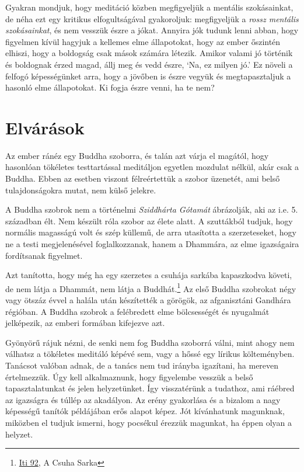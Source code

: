 Gyakran mondjuk, hogy meditáció közben megfigyeljük a mentális
szokásainkat, de néha ezt egy kritikus elfogultságával gyakoroljuk:
megfigyeljük a \emph{rossz mentális szokásainkat}, és nem vesszük észre
a jókat. Annyira jók tudunk lenni abban, hogy figyelmen kívül hagyjuk a
kellemes elme állapotokat, hogy az ember őszintén elhiszi, hogy a
boldogság csak mások számára létezik. Amikor valami jó történik és
boldognak érzed magad, állj meg és vedd észre, `Na, ez milyen jó.' Ez
növeli a felfogó képességünket arra, hogy a jövőben is észre vegyük és
megtapasztaljuk a hasonló elme állapotokat. Ki fogja észre venni, ha te
nem?

\clearpage

\section{Elvárások}


\noindent Az ember ránéz egy Buddha szoborra, és talán azt várja el
magától, hogy hasonlóan tökéletes testtartással meditáljon egyetlen
mozdulat nélkül, akár csak a Buddha. Ebben az esetben viszont
félreértettük a szobor üzenetét, ami belső tulajdonságokra mutat, nem
külső jelekre.

A Buddha szobrok nem a történelmi \emph{Sziddhárta Gótamát} ábrázolják,
aki az i.e. 5. században élt. Nem készült róla szobor az élete alatt. A
szuttákból tudjuk, hogy normális magasságú volt és szép küllemű, de arra
utasította a szerzeteseket, hogy ne a testi megjelenésével
foglalkozzanak, hanem a Dhammára, az elme igazságaira fordítsanak
figyelmet.

Azt tanította, hogy még ha egy szerzetes a csuhája sarkába kapaszkodva
követi, de nem látja a Dhammát, nem látja a Buddhát.\footnote{\href{https://suttacentral.net/iti92}{Iti
  92}, A Csuha Sarka} Az első Buddha szobrokat négy vagy ötszáz évvel a
halála után készítették a görögök, az afganisztáni Gandhára régióban. A
Buddha szobrok a felébredett elme bölcsességét és nyugalmát jelképezik,
az emberi formában kifejezve azt.

Gyönyörű rájuk nézni, de senki nem fog Buddha szoborrá válni, mint ahogy
nem válhatsz a tökéletes meditáló képévé sem, vagy a hőssé egy lírikus
költeményben. Tanácsot valóban adnak, de a tanács nem tud irányba
igazítani, ha mereven értelmezzük. Úgy kell alkalmaznunk, hogy
figyelembe vesszük a belső tapasztalatunkat és jelen helyzetünket. Így
visszatérünk a tudathoz, ami ráébred az igazságra és túllép az
akadályon. Az erény gyakorlása és a bizalom a nagy képességű tanítók
példájában erős alapot képez. Jót kívánhatunk magunknak, miközben el
tudjuk ismerni, hogy pocsékul érezzük magunkat, ha éppen olyan a
helyzet.

